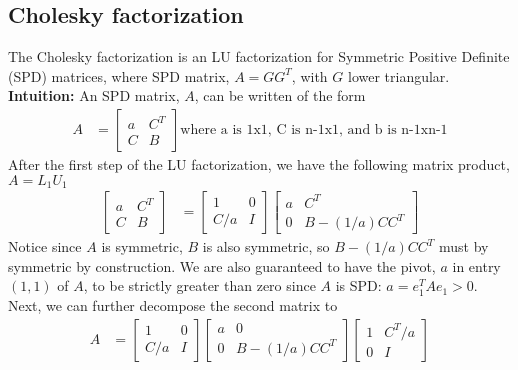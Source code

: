 \documentclass{article}
\begin{document}
\begin{itemize}
{\subsection{Cholesky factorization}
The Cholesky factorization is an LU factorization for Symmetric Positive Definite (SPD) matrices, where SPD matrix, $A = GG^T$, with $G$ lower triangular.\\
\textbf{Intuition:} An SPD matrix, $A$, can be written of the form
\begin{align*}
    A &= \begin{bmatrix} a & C^T\\ C &  B \end{bmatrix} \textrm{where a is 1x1, C is n-1x1, and b is n-1xn-1}
\end{align*}
After the first step of the LU factorization, we have the following matrix product, $A = L_1U_1$
\begin{align*}
    \begin{bmatrix} a & C^T\\ C &  B \end{bmatrix} &= 
    \begin{bmatrix} 1 & 0\\ C/a &  I \end{bmatrix} 
    \begin{bmatrix} a & C^T\\ 0 & B - (1/a)CC^T \end{bmatrix}
\end{align*}
Notice since $A$ is symmetric, $B$ is also symmetric, so $B - (1/a)CC^T$ must by symmetric by construction. We are also guaranteed to have the pivot, $a$ in entry $(1,1)$ of $A$, to be strictly greater than zero since $A$ is SPD: $a = e_1^TAe_1 > 0$. Next, we can further decompose the second matrix to
\begin{align*}
    A &= \begin{bmatrix} 1 & 0\\ C/a &  I\end{bmatrix}
    \begin{bmatrix} a & 0\\ 0 & B - (1/a)CC^T \end{bmatrix}
    \begin{bmatrix} 1 & C^T/a\\ 0 & I \end{bmatrix}
\end{align*}

}
\end{itemize}
\end{document}
